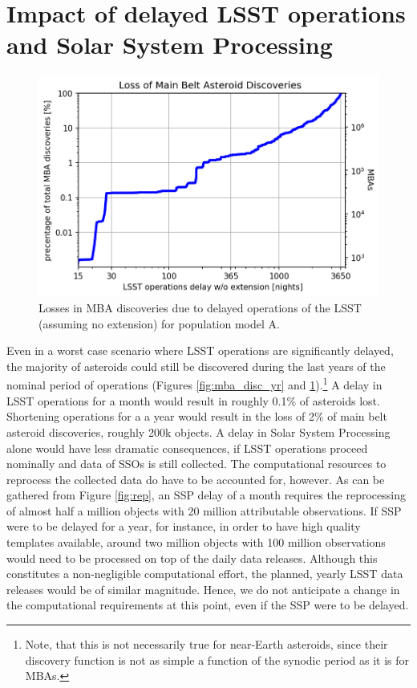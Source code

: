 \section{Impact of delayed \gls{LSST} operations and Solar System Processing} \label{sec:delay}
\begin{figure}[tb!]
\begin{center}
\includegraphics[width=0.70\linewidth]{figs/lost4.png}
\end{center}
\caption{Losses in MBA discoveries due to delayed operations of the \gls{LSST} (assuming no extension) for population model A.}
\label{fig:lost}       %
\end{figure}
Even in a worst case scenario where \gls{LSST} operations are significantly delayed, the majority of asteroids could still be discovered during the last years of the nominal period of operations (Figures \ref{fig:mba_disc_yr} and \ref{fig:lost}).\footnote{Note, that this is not necessarily true for near-Earth asteroids, since their discovery function is not as simple a function of the synodic period as it is for MBAs.} 
A delay in \gls{LSST} operations for a month would result in roughly 0.1\% of asteroids lost. Shortening operations for a 
a year would result in the loss of 2\% of main belt asteroid discoveries, roughly 200k objects.
A delay in Solar System Processing alone would have less dramatic consequences, if \gls{LSST} operations proceed nominally and data of SSOs is still collected.
The computational resources to reprocess the collected data do have to be accounted for, however. As can be gathered from Figure \ref{fig:rep}, an \gls{SSP} delay of a month requires the reprocessing of almost half a million objects with 20 million attributable observations. If \gls{SSP} were to be delayed for a year, for instance, in order to have high quality templates available, around two million objects with 100 million observations would need to be processed on top of the daily data releases. Although this constitutes a non-negligible computational effort, the planned, yearly \gls{LSST} data releases would be of similar magnitude. Hence, we do not anticipate a change in the computational requirements at this point, even if the \gls{SSP} were to be delayed.
